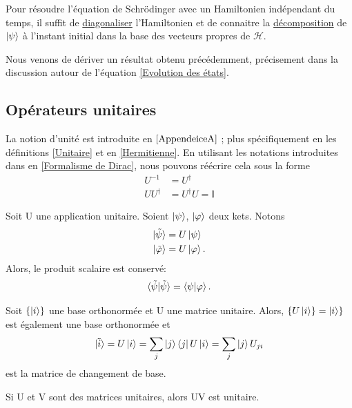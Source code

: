 \documentclass[../notesdecours.tex]{subfiles}
\begin{document}
Pour résoudre l'équation de Schrödinger avec un Hamiltonien indépendant du temps, il suffit de \underline{diagonaliser} l'Hamiltonien et de connaitre la \underline{décomposition} de $\ket{\psi}$ à l'instant initial dans la base des vecteurs propres de $\mathcal{H}$.\\

\begin{remark}
	Nous venons de dériver un résultat obtenu précédemment, précisement dans la discussion autour de l'équation \eqref{Evolution des états}.
\end{remark}

\subsection{Opérateurs unitaires}
La notion d'unité est introduite en $\ref{AppendeiceA}$ ; plus spécifiquement en les définitions \ref{Unitaire} et en \ref{Hermitienne}. En utilisant les notations introduites dans en \ref{Formalisme de Dirac}, nous pouvons réécrire cela sous la forme
\begin{align}
U^{-1} &= U^\dag\\
UU^\dag &= U^\dag U = \mathbb{I}
\end{align}
\begin{Property} Soit U une application unitaire. Soient $\ket{\psi}$, $\ket{\varphi}$ deux kets. Notons
\begin{align*}
\ket{\tilde{\psi}} &= U\ket{\psi}\\
\ket{\tilde{\varphi}} &= U\ket{\varphi}.
\end{align*}
Alors, le produit scalaire est conservé:
\begin{equation}
\braket{\tilde{\psi}|\tilde{\psi}} = \braket{\psi|\varphi}.
\end{equation}
\end{Property}

\begin{Property} 
Soit $\{\ket{i}\}$ une base orthonormée et U une matrice unitaire. Alors, $\{U\ket{i}\} = \ket{i}\}$ est également une base orthonormée et 
\begin{equation}
\ket{\tilde{i}} = U\ket{i} = \sum_j \ket{j}\bra{j}U\ket{i} = \sum_j \ket{j}U_{ji}
\end{equation}
est la matrice de changement de base.
\end{Property}

\begin{Property}
Si U et V sont des matrices unitaires, alors UV est unitaire. \end{Property}
\end{document}
